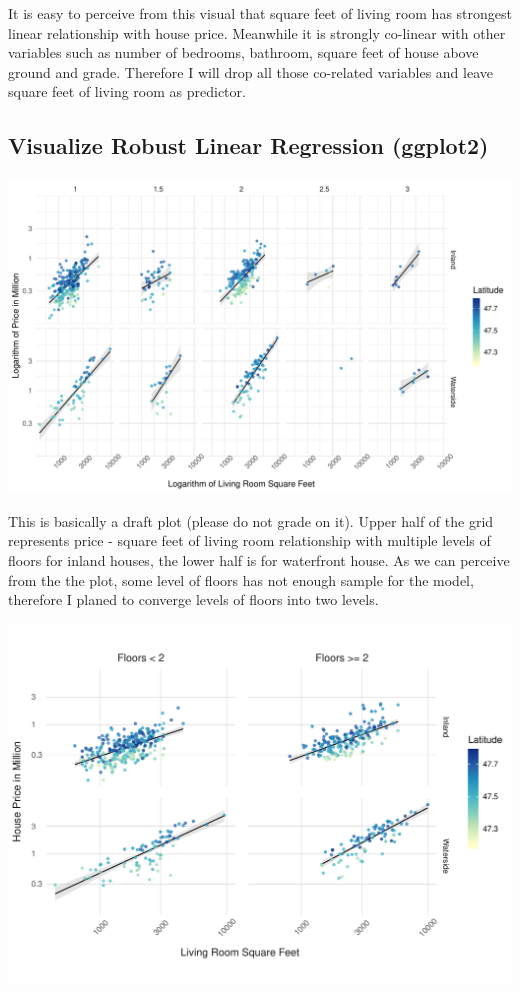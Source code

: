 \documentclass[11pt,letterpaper]{article}
\begin{document}
\noindent It is easy to perceive from this visual that square feet of living room has strongest linear relationship with house price. Meanwhile it is strongly co-linear with other variables such as number of bedrooms, bathroom, square feet of house above ground and grade. Therefore I will drop all those co-related variables and leave square feet of living room as predictor. 


\subsection*{Visualize Robust Linear Regression (ggplot2)}
\includegraphics[scale=0.8]{HW2-2.pdf}

\noindent This is basically a draft plot (please do not grade on it). Upper half of the grid represents price - square feet of living room relationship with multiple levels of floors for inland houses, the lower half is for waterfront house. As we can perceive from the the plot, some level of floors has not enough sample for the model, therefore I planed to converge  levels of floors into two levels. 

\includegraphics[scale=0.8]{hw2-3.pdf}
\end{document}
